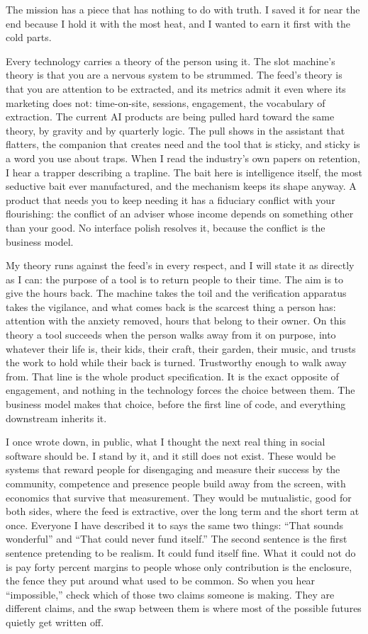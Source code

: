 \documentclass[11pt]{article}
\begin{document}
The mission has a piece that has nothing to do with truth. I saved it for near the end because I hold it with the most heat, and I wanted to earn it first with the cold parts.

Every technology carries a theory of the person using it. The slot machine's theory is that you are a nervous system to be strummed. The feed's theory is that you are attention to be extracted, and its metrics admit it even where its marketing does not: time-on-site, sessions, engagement, the vocabulary of extraction. The current AI products are being pulled hard toward the same theory, by gravity and by quarterly logic. The pull shows in the assistant that flatters, the companion that creates need and the tool that is sticky, and sticky is a word you use about traps. When I read the industry's own papers on retention, I hear a trapper describing a trapline. The bait here is intelligence itself, the most seductive bait ever manufactured, and the mechanism keeps its shape anyway. A product that needs you to keep needing it has a fiduciary conflict with your flourishing: the conflict of an adviser whose income depends on something other than your good. No interface polish resolves it, because the conflict is the business model.

My theory runs against the feed's in every respect, and I will state it as directly as I can: the purpose of a tool is to return people to their time. The aim is to give the hours back. The machine takes the toil and the verification apparatus takes the vigilance, and what comes back is the scarcest thing a person has: attention with the anxiety removed, hours that belong to their owner. On this theory a tool succeeds when the person walks away from it on purpose, into whatever their life is, their kids, their craft, their garden, their music, and trusts the work to hold while their back is turned. Trustworthy enough to walk away from. That line is the whole product specification. It is the exact opposite of engagement, and nothing in the technology forces the choice between them. The business model makes that choice, before the first line of code, and everything downstream inherits it.

I once wrote down, in public, what I thought the next real thing in social software should be. I stand by it, and it still does not exist. These would be systems that reward people for disengaging and measure their success by the community, competence and presence people build away from the screen, with economics that survive that measurement. They would be mutualistic, good for both sides, where the feed is extractive, over the long term and the short term at once. Everyone I have described it to says the same two things: ``That sounds wonderful'' and ``That could never fund itself.'' The second sentence is the first sentence pretending to be realism. It could fund itself fine. What it could not do is pay forty percent margins to people whose only contribution is the enclosure, the fence they put around what used to be common. So when you hear ``impossible,'' check which of those two claims someone is making. They are different claims, and the swap between them is where most of the possible futures quietly get written off.
\end{document}
